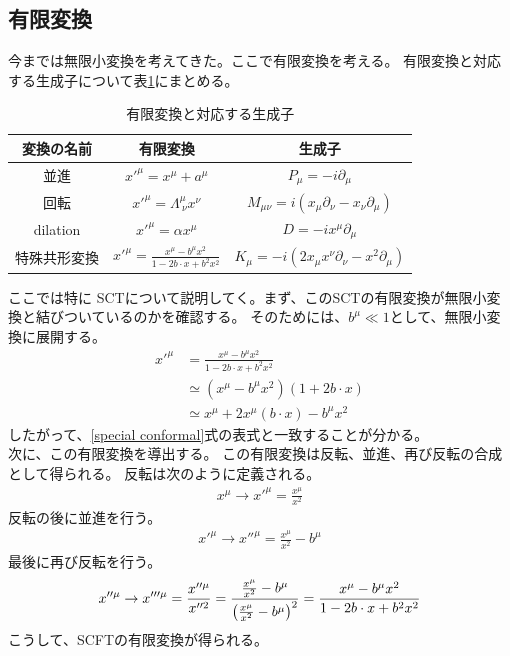 \documentclass[11pt, dvipdfmx]{article}
\numberwithin{equation}{section}
\begin{document}
\subsection{有限変換}
今までは無限小変換を考えてきた。ここで有限変換を考える。
有限変換と対応する生成子について表\ref{tab:finite_transformations}にまとめる。
\begin{table}[H]
    \centering
    \begin{tabular}{|c|c|c|}
        \hline
        変換の名前 & 有限変換 & 生成子 \\
        \hline
        並進 &$x'^\mu=x^\mu + a^\mu$& $P_\mu = -i\partial_\mu$ \\
        回転 & $x'^\mu = \Lambda^\mu_{\ \nu} x^\nu$ & $M_{\mu\nu} = i(x_\mu\partial_\nu - x_\nu\partial_\mu)$ \\
        dilation & $x'^\mu = \alpha x^\mu$ & $D = -ix^\mu\partial_\mu$ \\
        特殊共形変換 & $x'^\mu = \frac{x^\mu - b^\mu x^2}{1 - 2b\cdot x + b^2 x^2}$ & $K_\mu = -i(2x_\mu x^\nu\partial_\nu - x^2\partial_\mu)$ \\
        \hline
    \end{tabular}
    \caption{有限変換と対応する生成子}
    \label{tab:finite_transformations}
\end{table}
ここでは特に
SCTについて説明してく。まず、このSCTの有限変換が無限小変換と結びついているのかを確認する。
そのためには、$b^\mu\ll1$として、無限小変換に展開する。
\begin{align}
    x'^\mu &= \frac{x^\mu - b^\mu x^2}{1 - 2b\cdot x + b^2 x^2}\\
    &\simeq (x^\mu - b^\mu x^2)(1 + 2b\cdot x)\\
    &\simeq x^\mu + 2x^\mu(b\cdot x) - b^\mu x^2
\end{align}
したがって、\eqref{special conformal}式の表式と一致することが分かる。
\\次に、この有限変換を導出する。
この有限変換は反転、並進、再び反転の合成として得られる。
反転は次のように定義される。
\begin{align}
    x^\mu \to x'^\mu = \frac{x^\mu}{x^2}
\end{align}
反転の後に並進を行う。
\begin{align}
    x'^\mu \to x''^\mu = \frac{x^\mu}{x^2} - b^\mu
\end{align}
最後に再び反転を行う。
\begin{align}
    x''^\mu \to x'''^\mu = \frac{x''^\mu}{x''^2} = \frac{\frac{x^\mu}{x^2} - b^\mu}{\qty(\frac{x^\mu}{x^2} - b^\mu)^2} = \frac{x^\mu - b^\mu x^2}{1 - 2b\cdot x + b^2 x^2}
\end{align}
こうして、SCFTの有限変換が得られる。
\end{document}
